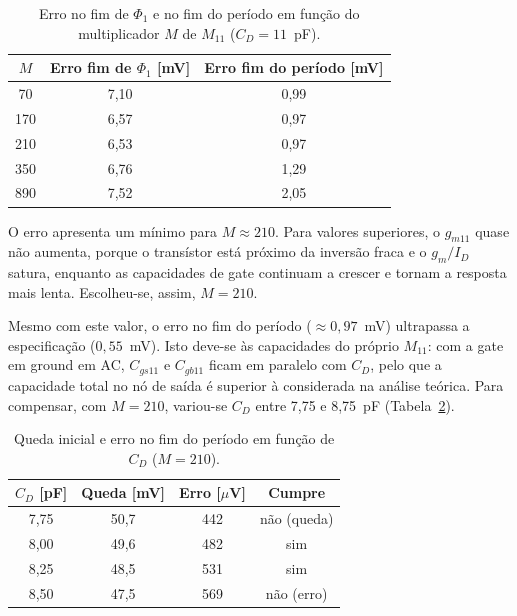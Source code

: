 \begin{table}[H]
    \centering
    \caption{Erro no fim de $\Phi_1$ e no fim do período em função do multiplicador $M$ de $M_{11}$ ($C_D = 11$~pF).}
    \label{tab:sweep_M}
    \begin{tabular}{ccc}
        \toprule
        $M$ & Erro fim de $\Phi_1$ [mV] & Erro fim do período [mV] \\
        \midrule
        70  & 7,10 & 0,99 \\
        170 & 6,57 & 0,97 \\
        210 & 6,53 & 0,97 \\
        350 & 6,76 & 1,29 \\
        890 & 7,52 & 2,05 \\
        \bottomrule
    \end{tabular}
\end{table}

O erro apresenta um mínimo para $M \approx 210$. Para valores superiores, o $g_{m11}$ quase não aumenta, porque o transístor está próximo da inversão fraca
e o $g_m/I_D$ satura, enquanto as capacidades de gate continuam a crescer e tornam a resposta mais lenta. Escolheu-se, assim, $M = 210$.

Mesmo com este valor, o erro no fim do período ($\approx 0{,}97$~mV) ultrapassa a especificação ($0{,}55$~mV). Isto deve-se às capacidades do próprio
$M_{11}$: com a gate em ground em AC, $C_{gs11}$ e $C_{gb11}$ ficam em paralelo com $C_D$, pelo que a capacidade total no nó de saída é superior à
considerada na análise teórica. Para compensar, com $M = 210$, variou-se $C_D$ entre 7,75 e 8,75~pF (Tabela~\ref{tab:sweep_cd_sim}).

\begin{table}[H]
    \centering
    \caption{Queda inicial e erro no fim do período em função de $C_D$ ($M = 210$).}
    \label{tab:sweep_cd_sim}
    \begin{tabular}{cccc}
        \toprule
        $C_D$ [pF] & Queda [mV] & Erro [$\mu$V] & Cumpre \\
        \midrule
        7,75 & 50,7 & 442 & não (queda) \\
        8,00 & 49,6 & 482 & sim \\
        8,25 & 48,5 & 531 & sim \\
        8,50 & 47,5 & 569 & não (erro) \\
        \bottomrule
    \end{tabular}
\end{table}

